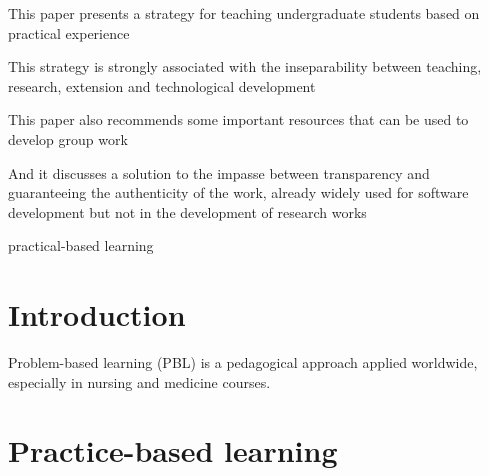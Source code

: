 \documentclass[preprint,12pt,authoryear]{elsarticle}
\begin{document}
\begin{frontmatter}
\begin{highlights}
\item This paper presents a strategy for teaching undergraduate students based on practical experience
\item This strategy is strongly associated with the inseparability between teaching, research, extension and technological development
\item This paper also recommends some important resources that can be used to develop group work
\item And it discusses a solution to the impasse between transparency and guaranteeing the authenticity of the work, already widely used for software development but not in the development of research works
\end{highlights}

\begin{keyword}
practical-based learning



\end{keyword}

\end{frontmatter}



\section{Introduction}
\label{}

Problem-based learning (PBL) is a pedagogical approach applied worldwide, especially in nursing and medicine courses. 

\section{Practice-based learning}
\label{}
\end{document}
